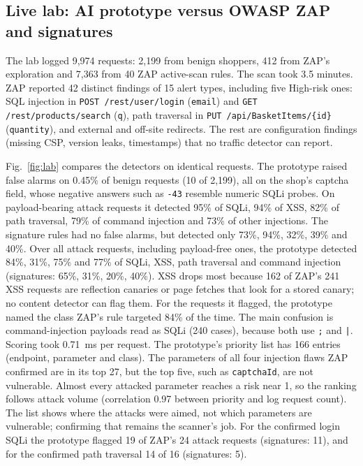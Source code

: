 \documentclass[conference]{IEEEtran}
\begin{document}
\subsection{Live lab: AI prototype versus OWASP ZAP and signatures}
The lab logged 9,974 requests: 2,199 from benign shoppers, 412 from ZAP's exploration and 7,363 from
40 ZAP active-scan rules. The scan took 3.5 minutes. ZAP reported 42 distinct findings of 15 alert types,
including five High-risk ones: SQL injection in \texttt{POST /rest/user/login} (\texttt{email}) and
\texttt{GET /rest/products/search} (\texttt{q}), path traversal in \texttt{PUT /api/BasketItems/\{id\}}
(\texttt{quantity}), and external and off-site redirects. The rest are configuration findings (missing CSP,
version leaks, timestamps) that no traffic detector can report.

Fig.~\ref{fig:lab} compares the detectors on identical requests. The prototype raised false alarms on
0.45\% of benign requests (10 of 2,199), all on the shop's captcha field, whose negative answers such as
\texttt{-43} resemble numeric SQLi probes. On payload-bearing attack requests it detected 95\% of SQLi,
94\% of XSS, 82\% of path traversal, 79\% of command injection and 73\% of other injections. The signature
rules had no false alarms, but detected only 73\%, 94\%, 32\%, 39\% and 40\%. Over all attack requests,
including payload-free ones, the prototype detected 84\%, 31\%, 75\% and 77\% of SQLi, XSS, path
traversal and command injection (signatures: 65\%, 31\%, 20\%, 40\%). XSS drops most because 162 of
ZAP's 241 XSS requests are reflection canaries or page fetches that look for a stored canary;
no content detector can flag them. For the requests it
flagged, the prototype named the class ZAP's rule targeted 84\% of the time. The main confusion is
command-injection payloads read as SQLi (240 cases), because both use \texttt{;} and \texttt{|}.
Scoring took 0.71~ms per request.
The prototype's priority list has 166 entries (endpoint, parameter and class). The parameters of all
four injection flaws ZAP confirmed are in its top 27, but the top five, such as \texttt{captchaId}, are
not vulnerable. Almost every attacked parameter reaches a risk near 1, so the ranking follows attack
volume (correlation 0.97 between priority and log request count). The list shows where the
attacks were aimed, not which parameters are vulnerable; confirming that remains the scanner's job.
For the confirmed login SQLi the prototype flagged 19 of ZAP's 24 attack requests (signatures: 11),
and for the confirmed path traversal 14 of 16 (signatures: 5).
\end{document}
